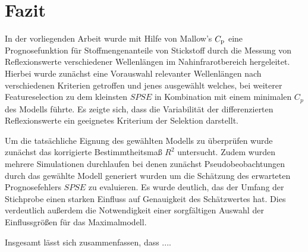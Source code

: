 \section{Fazit}
\label{sec:Fazit}

    In der vorliegenden Arbeit wurde mit Hilfe von Mallow's $C_{\mathrm{p}}$ eine Prognosefunktion für Stoffmengenanteile von Stickstoff durch die Messung von Reflexionswerte verschiedener Wellenlängen im Nahinfrarotbereich hergeleitet.
    Hierbei wurde zunächst eine Vorauswahl relevanter Wellenlängen nach verschiedenen Kriterien getroffen und jenes ausgewählt welches, bei weiterer Featureselection zu dem kleinsten $SPSE$ in Kombination mit einem minimalen $C_{p}$ des Modells führte.
    Es zeigte sich, dass die Variabilität der differenzierten Reflexionswerte ein geeignetes Kriterium der Selektion darstellt.
    
    Um die tatsächliche Eignung des gewählten Modells zu überprüfen wurde zunächst das korrigierte Bestimmtheitsmaß $R^2$ untersucht.
    Zudem wurden mehrere Simulationen durchlaufen bei denen zunächst Pseudobeobachtungen durch das gewählte Modell generiert wurden um die Schätzung des erwarteten Prognosefehlers $SPSE$ zu evaluieren.
    Es wurde deutlich, das der Umfang der Stichprobe einen starken Einfluss auf Genauigkeit des Schätzwertes hat.
    Dies verdeutlich außerdem die Notwendigkeit einer sorgfältigen Auswahl der Einflussgrößen für das Maximalmodell.
    
    Insgesamt lässt sich zusammenfassen, dass ....
    
	


